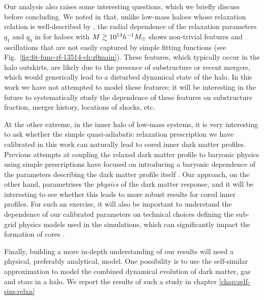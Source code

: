Our analysis also raises some interesting questions, which we briefly discuss before concluding. We noted in  that, unlike low-mass haloes whose relaxation relation is well-described by , the radial dependence of the relaxation parameters $q_1$ and $q_0$ in  for haloes with $M\gtrsim10^{13}h^{-1}M_{\odot}$ shows non-trivial features and oscillations that are not easily captured by simple fitting functions (see Fig.~\ref{fig:fit-func-rf-13514-ch:z0main}). These features, which typically occur in the halo outskirts, are likely due to the presence of substructure or recent mergers, which would generically lead to a disturbed dynamical state of the halo. In this work we have not attempted to model these features; it will be interesting in the future to systematically study the dependence of these features on substructure fraction, merger history, locations of shocks, etc.

At the other extreme, in the inner halo of low-mass systems, it is very interesting to ask whether the simple quasi-adiabatic relaxation prescription we have calibrated in this work can naturally lead to cored inner dark matter profiles. Previous attempts at coupling the relaxed dark matter profile to baryonic physics using simple prescriptions have focused on introducing a baryonic dependence of the parameters describing the dark matter profile itself \citep[e.g.,][]{2014MNRAS.441.2986D}. Our approach, on the other hand, parametrises the \emph{physics} of the dark matter response, and it will be interesting to see whether this leads to more robust results for cored inner profiles. For such an exercise, it will also be important to understand the dependence of our calibrated parameters on technical choices defining the sub-grid physics models used in the simulations, which can significantly impact the formation of cores \citep{bfln18}. 

Finally, building a more in-depth understanding of our results will need a physical, preferably analytical, model. One possibility is to use the self-similar approximation \citep[][]{fg84,bertschinger85,launagai+15,shi16}
to model the combined dynamical evolution of dark matter, gas and stars in a halo.
We report the results of such a study in chapter \ref{chap:self-sim-relxn}

 
